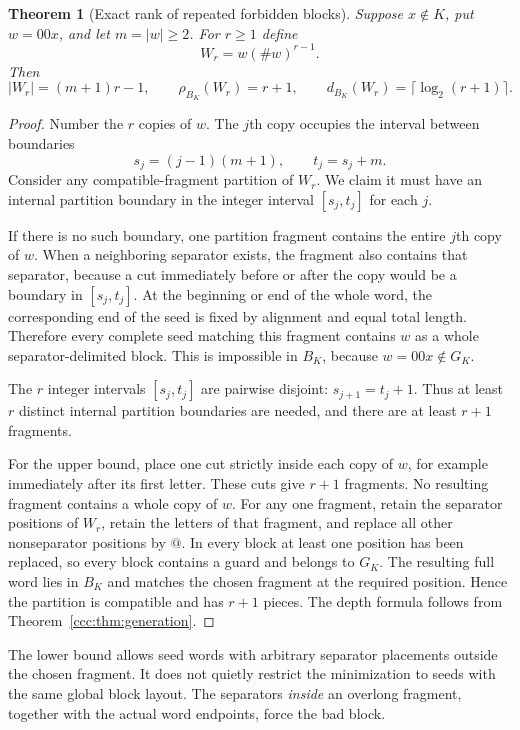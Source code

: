\documentclass[11pt,letterpaper]{article}
\makeatletter
\newtheorem{theorem}{Theorem}[section]
\theoremstyle{definition}
\theoremstyle{remark}
\newcommand{\rank}{\rho}
\newcommand{\guard}{\mathtt{@}}
\newcommand{\sep}{\mathtt{\#}}
\makeatother
\begin{document}
\begin{theorem}[Exact rank of repeated forbidden blocks]
\label{ccc:thm:amplification}
Suppose $x\notin K$, put $w=00x$, and let $m=|w|\geq2$. For $r\geq1$ define
\[
 W_r=w(\sep w)^{r-1}.
\]
Then
\begin{equation}
 |W_r|=(m+1)r-1,\qquad
 \rank_{B_K}(W_r)=r+1,\qquad
 d_{B_K}(W_r)=\lceil\log_2(r+1)\rceil.
 \label{ccc:eq:blockrank}
\end{equation}
\end{theorem}
\begin{proof}
Number the $r$ copies of $w$. The $j$th copy occupies the interval between
boundaries
\[
 s_j=(j-1)(m+1),\qquad t_j=s_j+m.
\]
Consider any compatible-fragment partition of $W_r$.
We claim it must have an internal partition boundary in the integer interval
$[s_j,t_j]$ for each $j$.

If there is no such boundary, one partition fragment contains the entire
$j$th copy of $w$. When a neighboring separator exists, the fragment also
contains that separator, because a cut immediately before or after the copy
would be a boundary in $[s_j,t_j]$. At the beginning or end of the whole word,
the corresponding end of the seed is fixed by alignment and equal total
length. Therefore every complete seed matching this fragment contains $w$
as a whole separator-delimited block. This is impossible in $B_K$, because
$w=00x\notin G_K$.

The $r$ integer intervals $[s_j,t_j]$ are pairwise disjoint:
$s_{j+1}=t_j+1$. Thus at least $r$ distinct internal partition boundaries are
needed, and there are at least $r+1$ fragments.

For the upper bound, place one cut strictly inside each copy of $w$, for
example immediately after its first letter. These cuts give $r+1$ fragments.
No resulting fragment contains a whole copy of $w$. For any one fragment,
retain the separator positions of $W_r$, retain the letters of that fragment,
and replace all other nonseparator positions by $\guard$. In every block at
least one position has been replaced, so every block contains a guard and
belongs to $G_K$. The resulting full word lies in $B_K$ and matches the
chosen fragment at the required position. Hence the partition is compatible
and has $r+1$ pieces. The depth formula follows from
Theorem~\ref{ccc:thm:generation}.
\end{proof}

The lower bound allows seed words with arbitrary separator placements outside
the chosen fragment. It does not quietly restrict the minimization to seeds
with the same global block layout. The separators \emph{inside} an overlong
fragment, together with the actual word endpoints, force the bad block.
\end{document}

